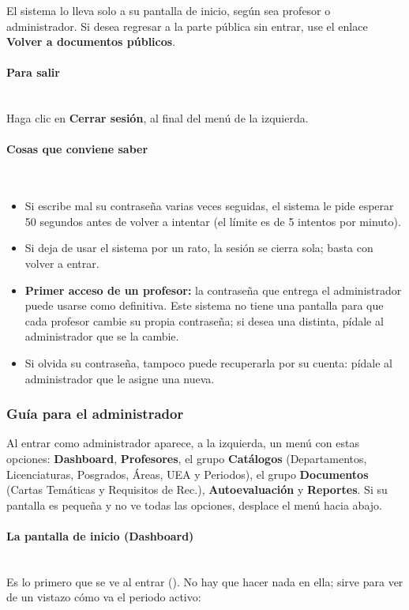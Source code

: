 El sistema lo lleva solo a su pantalla de inicio, según sea profesor o administrador. Si desea regresar a la parte pública sin entrar, use el enlace \textbf{Volver a documentos públicos}.

\paragraph{Para salir}\mbox{}\\
Haga clic en \textbf{Cerrar sesión}, al final del menú de la izquierda.

\paragraph{Cosas que conviene saber}\mbox{}\\
\begin{itemize}
    \item Si escribe mal su contraseña varias veces seguidas, el sistema le pide esperar 50 segundos antes de volver a intentar (el límite es de 5 intentos por minuto).
    \item Si deja de usar el sistema por un rato, la sesión se cierra sola; basta con volver a entrar.
    \item \textbf{Primer acceso de un profesor:} la contraseña que entrega el administrador puede usarse como definitiva. Este sistema no tiene una pantalla para que cada profesor cambie su propia contraseña; si desea una distinta, pídale al administrador que se la cambie.
    \item Si olvida su contraseña, tampoco puede recuperarla por su cuenta: pídale al administrador que le asigne una nueva.
\end{itemize}

\subsubsection{Guía para el administrador}\label{apx:manual-user:admin}

Al entrar como administrador aparece, a la izquierda, un menú con estas opciones: \textbf{Dashboard}, \textbf{Profesores}, el grupo \textbf{Catálogos} (Departamentos, Licenciaturas, Posgrados, Áreas, UEA y Periodos), el grupo \textbf{Documentos} (Cartas Temáticas y Requisitos de Rec.), \textbf{Autoevaluación} y \textbf{Reportes}. Si su pantalla es pequeña y no ve todas las opciones, desplace el menú hacia abajo.

\paragraph{La pantalla de inicio (Dashboard)}\mbox{}\\
Es lo primero que se ve al entrar (). No hay que hacer nada en ella; sirve para ver de un vistazo cómo va el periodo activo:

